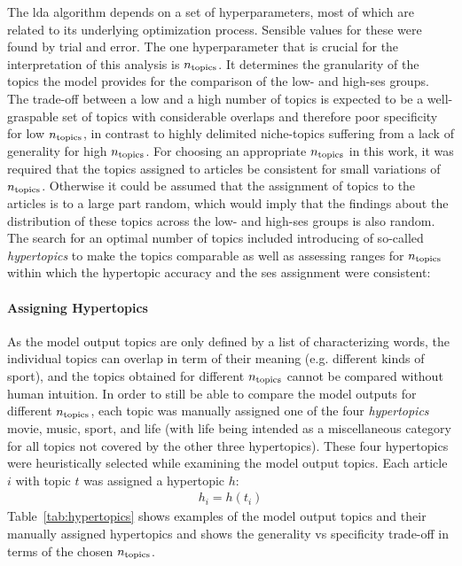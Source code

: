 The \gls{lda} algorithm depends on a set of hyperparameters, most of which are related to its underlying optimization process.  Sensible values for these were found by trial and error. The one hyperparameter that is crucial for the interpretation of this analysis is $n_\text{topics}$. It determines the granularity of the topics the model provides for the comparison of the low- and high-\gls{ses} groups. The trade-off between a low and a high number of topics is expected to be a well-graspable set of topics with considerable overlaps and therefore poor specificity for low $n_\text{topics}$, in contrast to highly delimited niche-topics suffering from a lack of generality for high $n_\text{topics}$. For choosing an appropriate $n_\text{topics}$ in this work, it was required that the topics assigned to articles be consistent for small variations of $n_\text{topics}$. Otherwise it could be assumed that the assignment of topics to the articles is to a large part random, which would imply that the findings about the distribution of these topics across the low- and high-\gls{ses} groups is also random. The search for an optimal number of topics included introducing of so-called \textit{hypertopics} to make the topics comparable as well as assessing ranges for $n_\text{topics}$ within which the hypertopic accuracy and the \gls{ses} assignment were consistent:

\paragraph{Assigning Hypertopics}
As the model output topics are only defined by a list of characterizing words, the individual topics can overlap in term of their meaning (e.g. different kinds of sport), and the topics obtained for different $n_\text{topics}$ cannot be compared without human intuition. In order to still be able to compare the model outputs for different $n_\text{topics}$, each topic was manually assigned one of the four \textit{hypertopics} movie, music, sport, and life (with life being intended as a miscellaneous category for all topics not covered by the other three hypertopics). These four hypertopics were heuristically selected while examining the model output topics. Each article $i$ with topic $t$ was assigned a hypertopic $h$:
\begin{align}
    h_i = h(t_i)
\end{align}
Table~\ref{tab:hypertopics} shows examples of the model output topics and their manually assigned hypertopics and shows the generality vs specificity trade-off in terms of the chosen $n_\text{topics}$.

